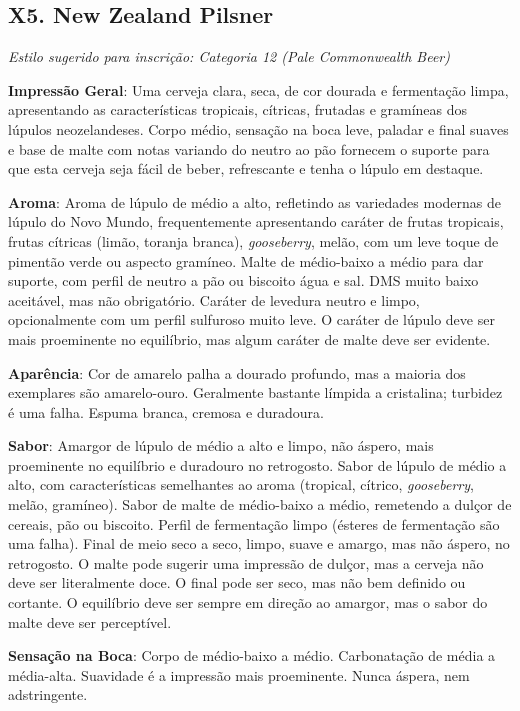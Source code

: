 \subsection*{X5. New Zealand Pilsner}

\textit{Estilo sugerido para inscrição: Categoria 12 (Pale Commonwealth Beer)}

\textbf{Impressão Geral}: Uma cerveja clara, seca, de cor dourada e fermentação limpa, apresentando as características tropicais, cítricas, frutadas e gramíneas dos lúpulos neozelandeses. Corpo médio, sensação na boca leve, paladar e final suaves e base de malte com notas variando do neutro ao pão fornecem o suporte para que esta cerveja seja fácil de beber, refrescante e tenha o lúpulo em destaque.

\textbf{Aroma}: Aroma de lúpulo de médio a alto, refletindo as variedades modernas de lúpulo do Novo Mundo, frequentemente apresentando caráter de frutas tropicais, frutas cítricas (limão, toranja branca), \textit{gooseberry}, melão, com um leve toque de pimentão verde ou aspecto gramíneo. Malte de médio-baixo a médio para dar suporte, com perfil de neutro a pão ou biscoito água e sal. DMS muito baixo aceitável, mas não obrigatório. Caráter de levedura neutro e limpo, opcionalmente com um perfil sulfuroso muito leve. O caráter de lúpulo deve ser mais proeminente no equilíbrio, mas algum caráter de malte deve ser evidente.

\textbf{Aparência}: Cor de amarelo palha a dourado profundo, mas a maioria dos exemplares são amarelo-ouro. Geralmente bastante límpida a cristalina; turbidez é uma falha. Espuma branca, cremosa e duradoura.

\textbf{Sabor}: Amargor de lúpulo de médio a alto e limpo, não áspero, mais proeminente no equilíbrio e duradouro no retrogosto. Sabor de lúpulo de médio a alto, com características semelhantes ao aroma (tropical, cítrico, \textit{gooseberry}, melão, gramíneo). Sabor de malte de médio-baixo a médio, remetendo a dulçor de cereais, pão ou biscoito. Perfil de fermentação limpo (ésteres de fermentação são uma falha). Final de meio seco a seco, limpo, suave e amargo, mas não áspero, no retrogosto. O malte pode sugerir uma impressão de dulçor, mas a cerveja não deve ser literalmente doce. O final pode ser seco, mas não bem definido ou cortante. O equilíbrio deve ser sempre em direção ao amargor, mas o sabor do malte deve ser perceptível.

\textbf{Sensação na Boca}: Corpo de médio-baixo a médio. Carbonatação de média a média-alta. Suavidade é a impressão mais proeminente. Nunca áspera, nem adstringente.

